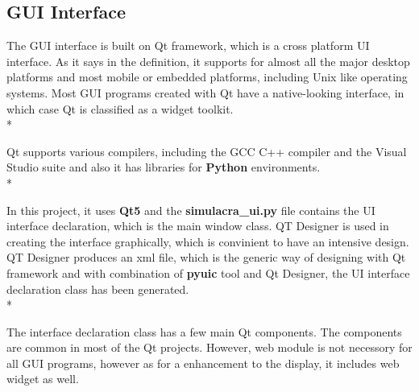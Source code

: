 \documentclass[11pt]{article}
\begin{document}
\subsection{GUI Interface}

The GUI interface is built on Qt framework, which is a cross platform UI interface. As it says in the definition, it supports for almost all the major desktop platforms and most mobile or embedded platforms, including Unix like operating systems. Most GUI programs created with Qt have a native-looking interface, in which case Qt is classified as a widget toolkit.\\* 

\noindent
Qt supports various compilers, including the GCC C++ compiler and the Visual Studio suite and also it has libraries for \textbf{Python} environments. \\*

\noindent
In this project, it uses \textbf{Qt5} and the \textbf{simulacra\_ui.py} file contains the UI interface declaration, which is the main window class. QT Designer is used in creating the interface graphically, which is convinient to have an intensive design. QT Designer produces an xml file, which is the generic way of designing with Qt framework and with combination of \textbf{pyuic} tool and Qt Designer, the UI interface declaration class has been generated.\\*

\noindent
The interface declaration class has a few main Qt components. The components are common in most of the Qt projects. However, web module is not necessory for all GUI programs, however as for a enhancement to the display, it includes web widget as well.
\end{document}
